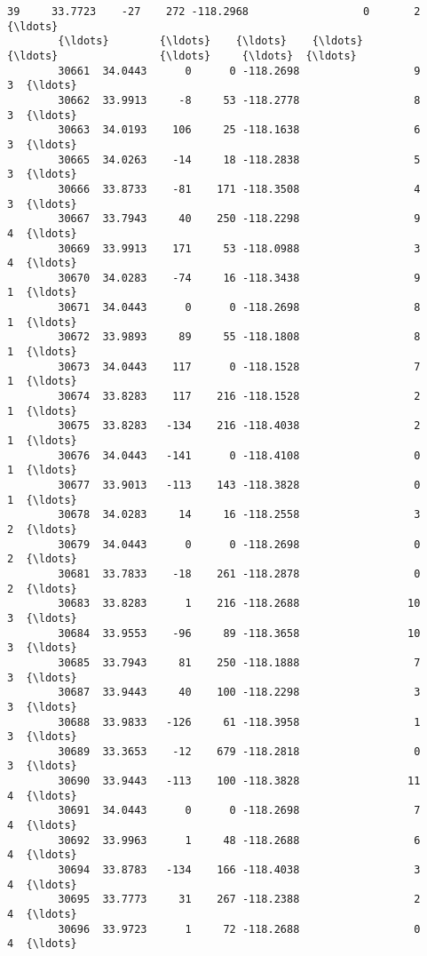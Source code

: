 \documentclass[11pt]{article}
\begin{document}
\begin{Verbatim}[commandchars=\\\{\}]
        39     33.7723    -27    272 -118.2968                  0       2  {\ldots}     
        {\ldots}        {\ldots}    {\ldots}    {\ldots}       {\ldots}                {\ldots}     {\ldots}  {\ldots}     
        30661  34.0443      0      0 -118.2698                  9       3  {\ldots}     
        30662  33.9913     -8     53 -118.2778                  8       3  {\ldots}     
        30663  34.0193    106     25 -118.1638                  6       3  {\ldots}     
        30665  34.0263    -14     18 -118.2838                  5       3  {\ldots}     
        30666  33.8733    -81    171 -118.3508                  4       3  {\ldots}     
        30667  33.7943     40    250 -118.2298                  9       4  {\ldots}     
        30669  33.9913    171     53 -118.0988                  3       4  {\ldots}     
        30670  34.0283    -74     16 -118.3438                  9       1  {\ldots}     
        30671  34.0443      0      0 -118.2698                  8       1  {\ldots}     
        30672  33.9893     89     55 -118.1808                  8       1  {\ldots}     
        30673  34.0443    117      0 -118.1528                  7       1  {\ldots}     
        30674  33.8283    117    216 -118.1528                  2       1  {\ldots}     
        30675  33.8283   -134    216 -118.4038                  2       1  {\ldots}     
        30676  34.0443   -141      0 -118.4108                  0       1  {\ldots}     
        30677  33.9013   -113    143 -118.3828                  0       1  {\ldots}     
        30678  34.0283     14     16 -118.2558                  3       2  {\ldots}     
        30679  34.0443      0      0 -118.2698                  0       2  {\ldots}     
        30681  33.7833    -18    261 -118.2878                  0       2  {\ldots}     
        30683  33.8283      1    216 -118.2688                 10       3  {\ldots}     
        30684  33.9553    -96     89 -118.3658                 10       3  {\ldots}     
        30685  33.7943     81    250 -118.1888                  7       3  {\ldots}     
        30687  33.9443     40    100 -118.2298                  3       3  {\ldots}     
        30688  33.9833   -126     61 -118.3958                  1       3  {\ldots}     
        30689  33.3653    -12    679 -118.2818                  0       3  {\ldots}     
        30690  33.9443   -113    100 -118.3828                 11       4  {\ldots}     
        30691  34.0443      0      0 -118.2698                  7       4  {\ldots}     
        30692  33.9963      1     48 -118.2688                  6       4  {\ldots}     
        30694  33.8783   -134    166 -118.4038                  3       4  {\ldots}     
        30695  33.7773     31    267 -118.2388                  2       4  {\ldots}     
        30696  33.9723      1     72 -118.2688                  0       4  {\ldots}     
        

\end{Verbatim}
\end{document}
